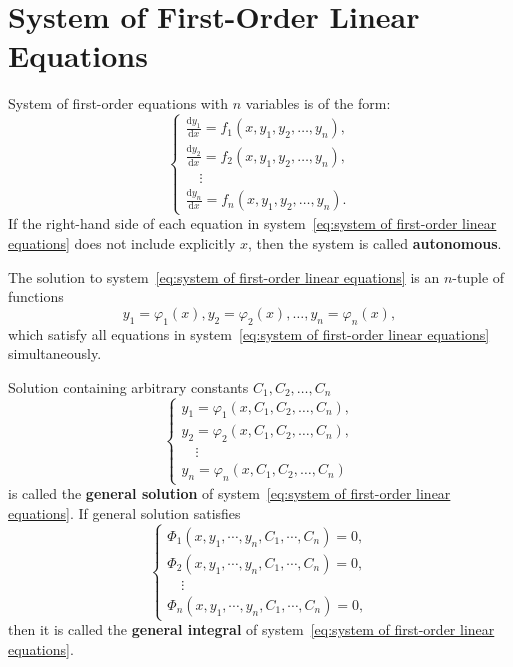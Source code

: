 \documentclass[11pt]{../../TexTemplate/elegantbook}
\begin{document}
\section{System of First-Order Linear Equations}
System of first-order equations with \(n\) variables is of the form:
\begin{equation}\label{eq:system of first-order linear equations}
    \begin{cases}
        \frac{\mathrm{d}y_1}{\mathrm{d}x} = f_1(x, y_1, y_2, \ldots, y_n), \\
        \frac{\mathrm{d}y_2}{\mathrm{d}x} = f_2(x, y_1, y_2, \ldots, y_n), \\
        \quad\vdots \\
        \frac{\mathrm{d}y_n}{\mathrm{d}x} = f_n(x, y_1, y_2, \ldots, y_n).
    \end{cases}
\end{equation}
If the right-hand side of each equation in system~\eqref{eq:system of first-order linear equations}
does not include explicitly \(x\), then the system is called \textbf{autonomous}.

The solution to system~\eqref{eq:system of first-order linear equations} is an \(n\)-tuple of functions
\[y_1 = \varphi_1(x), y_2 = \varphi_2(x), \ldots, y_n = \varphi_n(x),\]
which satisfy all equations in system~\eqref{eq:system of first-order linear equations} simultaneously.

Solution containing arbitrary constants \(C_{1}, C_{2}, \ldots, C_{n}\)
\[
\begin{cases} 
    y_{1}=\varphi_{1}(x, C_{1}, C_{2}, \ldots, C_{n}),\\ 
    y_{2}=\varphi_{2}(x, C_{1}, C_{2}, \ldots, C_{n}), \\ 
    \quad\vdots \\ 
    y_{n}=\varphi_{n}(x, C_{1}, C_{2}, \ldots, C_{n}) 
\end{cases}
\]
is called the \textbf{general solution} of system~\eqref{eq:system of first-order linear equations}.
If general solution satisfies 
\[
\begin{cases} 
    \Phi_{1}(x, y_{1}, \cdots, y_{n}, C_{1}, \cdots, C_{n})=0, \\ 
    \Phi_{2}(x, y_{1}, \cdots, y_{n}, C_{1}, \cdots, C_{n})=0, \\ 
    \quad\vdots \\ 
    \Phi_{n}(x, y_{1}, \cdots, y_{n}, C_{1}, \cdots, C_{n})=0,
\end{cases}
\]
then it is called the \textbf{general integral} of system~\eqref{eq:system of first-order linear equations}.
\end{document}
